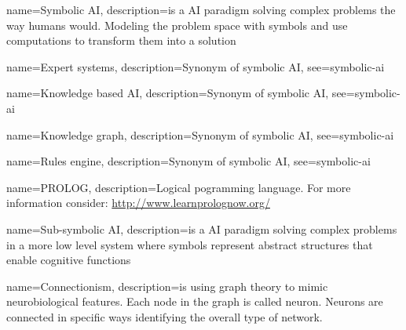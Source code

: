 



{
  name={Symbolic AI},
  description={is a AI paradigm solving complex problems the way humans would. Modeling the problem space with symbols and use computations to transform them into a solution}
}

{
  name={Expert systems},
  description={Synonym of symbolic AI},
  see={symbolic-ai}
}

{
  name={Knowledge based AI},
  description={Synonym of symbolic AI},
  see={symbolic-ai}
}

{
  name={Knowledge graph},
  description={Synonym of symbolic AI},
  see={symbolic-ai}
}

{
  name={Rules engine},
  description={Synonym of symbolic AI},
  see={symbolic-ai}
}

{
  name={PROLOG},
  description={Logical pogramming language. For more information consider: \url{http://www.learnprolognow.org/}}
}

{
  name={Sub-symbolic AI},
  description={is a AI paradigm solving complex problems in a more low level system where symbols represent abstract structures that enable cognitive functions}
}

{
  name={Connectionism},
  description={is using graph theory to mimic neurobiological features. Each node in the graph is called neuron. Neurons are connected in specific ways identifying the overall type of network.}
}